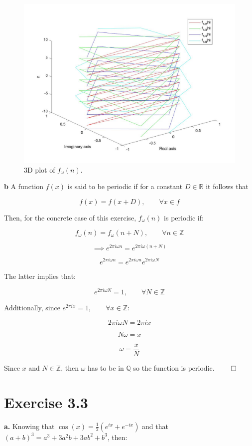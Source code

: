 \documentclass[12pt]{article}
\begin{document}
	\begin{figure}[h!]
	\centering
	\includegraphics[width = 0.75\linewidth]{plot_3D}
	\caption{3D plot of $f_\omega(n)$.}
	\label{fig:plot2}
	\end{figure}
	\newpage
	\textbf{b} A function $f(x)$ is said to be periodic if for a constant $D \in \mathbb{R}$ it follows that 
	
	$$f(x) = f(x+D), \qquad \forall x \in f$$
	
	Then, for the concrete case of this exercise, $f_\omega (n)$ is periodic if:
	
	$$ f_\omega (n) = f_\omega (n + N), \qquad  \forall n \in \mathbb{Z}$$
	
	$$\implies e^{2\pi i \omega n} = e^{2\pi i \omega (n+N)}$$
	
	$$ e^{2\pi i \omega n} = e^{2\pi i \omega n} e^{2\pi i \omega N} $$
	
	The latter implies that:
	
	$$e^{2\pi i \omega N} = 1, \qquad \forall N \in \mathbb{Z}$$
	
	Additionally, since $e^{2\pi i x} = 1, \qquad \forall x \in \mathbb{Z}$:
	
	$$2\pi i \omega N = 2\pi i x$$
	
	$$N\omega = x$$
	
	$$ \omega = \frac{x}{N} $$
	
	Since $x$ and $N \in \mathbb{Z}$, then $\omega$ has to be in $\mathbb{Q}$ so the function is periodic. \hfill $\qed$

	\section*{Exercise 3.3}
	\textbf{a.} Knowing that $\cos(x) = \frac{1}{2}\left(e^{ix} + e^{-ix}\right)$ and that $(a+b)^3 = a^3 + 3a^2b + 3ab^2 + b^3$, then:
	
\end{document}
